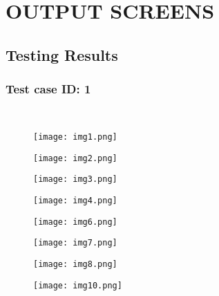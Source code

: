 \documentclass[12pt,a4paper]{report}
\begin{document}
\chapter{OUTPUT SCREENS}
\section{Testing Results}
\subsection{Test case ID: 1}\\

\begin{figure}[h!]
\texttt{[image: img1.png]}
\caption{}
\end{figure}

\newpage
\begin{figure}[h!]
\texttt{[image: img2.png]}
\caption{}
\end{figure}

\newpage
\begin{figure}[h!]
\texttt{[image: img3.png]}
\caption{}
\end{figure}

\newpage
\begin{figure}[h!]
\texttt{[image: img4.png]}
\caption{}
\end{figure}

\newpage
\begin{figure}[h!]
\texttt{[image: img6.png]}
\caption{}
\end{figure}

\newpage
\begin{figure}[h!]
\texttt{[image: img7.png]}
\caption{}
\end{figure}

\newpage
\begin{figure}[h!]
\texttt{[image: img8.png]}
\caption{}
\end{figure}

\newpage
\begin{figure}[h!]
\texttt{[image: img10.png]}
\caption{}
\end{figure}
\end{document}
